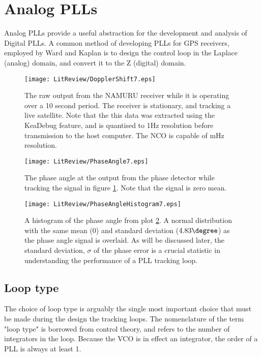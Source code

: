 

\clearpage

\section{Analog PLLs}
Analog PLLs provide a useful abstraction for the development and analysis of Digital PLLs. A common method of developing PLLs for \ac{GPS} receivers, employed by Ward and Kaplan \cite{Ward,Kaplan} is to design the control loop in the Laplace (analog) domain, and convert it to the Z (digital) domain. 

\begin{figure}[!htb] 
    \centering
    \texttt{[image: LitReview/DopplerShift7.eps]} 
    \caption{The raw output from the \ac{NAMURU} receiver while it is operating over a 10 second period. 
    The receiver is stationary, and tracking a live satellite. Note that the this data was extracted using the KeaDebug feature, and is quantised to 1Hz resolution before transmission to the host computer. The NCO is capable of mHz resolution.}
    \label{fig:DopplerShiftStationary}
\end{figure}

\begin{figure}[!htb] 
    \centering
    \texttt{[image: LitReview/PhaseAngle7.eps]} 
    \caption{The phase angle at the output from the phase detector while tracking the signal in figure \ref{fig:DopplerShiftStationary}. Note that the signal is zero mean.}
    \label{fig:PhaseAngleStationary}
\end{figure}

\begin{figure}[!htb] 
    \centering
    \texttt{[image: LitReview/PhaseAngleHistogram7.eps]} 
    \caption{A histogram of the phase angle from plot \ref{fig:PhaseAngleStationary}. A normal distribution with the 
    same mean (0) and standard deviation ($4.83\degree$) as the phase angle signal is overlaid. As will be discussed later, the standard deviation, $\sigma$ of the phase error is a crucial statistic in understanding the performance of a PLL tracking loop.}
    \label{fig:PhaseAngleHistogramStationary}
\end{figure}

	\subsection{Loop type}
    The choice of loop type is arguably the single most important choice that must be made
    during the design the tracking loops. The nomenclature of the term "loop type" is borrowed from control theory, and refers to the number of integrators in the loop\cite{Gardner}. Because the \ac{VCO} is in effect an integrator, the order of a PLL is always at least 1. 
    

